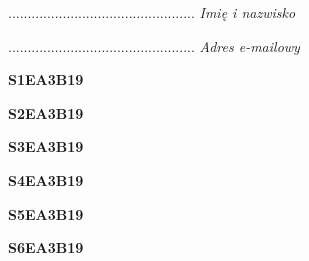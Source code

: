 \begin{turn}{90}\begin{minipage}{\linewidth} \vspace{20mm} ................................................  \textit{Imię i nazwisko}\end{minipage}\end{turn}

\begin{turn}{90}\begin{minipage}{\linewidth} \vspace{20mm} ................................................  \textit{Adres e-mailowy}\end{minipage}\end{turn}

\begin{turn}{90}\huge \begin{minipage}{\linewidth} \vspace{10mm}\textbf{S1EA3B19}\end{minipage}\end{turn}

\begin{turn}{90}\huge \begin{minipage}{\linewidth} \vspace{10mm}\textbf{S2EA3B19}\end{minipage}\end{turn}

\begin{turn}{90}\huge \begin{minipage}{\linewidth} \vspace{10mm}\textbf{S3EA3B19}\end{minipage}\end{turn}

\begin{turn}{90}\huge \begin{minipage}{\linewidth} \vspace{10mm}\textbf{S4EA3B19}\end{minipage}\end{turn}

\begin{turn}{90}\huge \begin{minipage}{\linewidth} \vspace{10mm}\textbf{S5EA3B19}\end{minipage}\end{turn}

\begin{turn}{90}\huge \begin{minipage}{\linewidth} \vspace{10mm}\textbf{S6EA3B19}\end{minipage}\end{turn}

